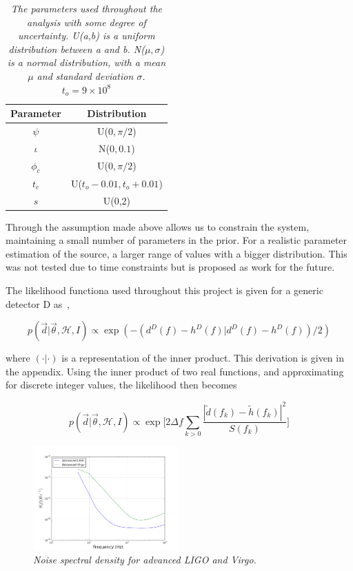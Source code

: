 \documentclass[12pt]{iopart}
\newcommand{\curlH}{\mathcal{H}}
\begin{document}
\begin{table}
  \centering
  \begin{tabular}{|c|c|}
    \hline
    Parameter & Distribution \\
    \hline
    $\psi$   &  U($0,\pi/2$)\\
    $\iota$   & N($0,0.1$) \\
    $\phi_c$  & U($0,\pi/2$)\\
    $t_c$     & U($t_{o}-0.01, t_{o}+0.01$) \\
    $s$       & U(0,2) \\
    \hline
  \end{tabular}
  \label{tab:prior}
  \caption{\textit{The parameters used throughout the analysis with some degree
of uncertainty. U(a,b) is a uniform distribution between a and b. N($\mu,
\sigma$) is a normal distribution, with a mean $\mu$ and standard deviation
$\sigma$. $t_{o} = 9\times10^{8}$}}
\end{table}

Through the assumption made above allows us to constrain the system,
maintaining a small number of parameters in the prior. For a realistic
parameter estimation of the source, a larger range of values with a bigger
distribution. This was not tested due to time constraints but is proposed as
work for the future.

The likelihood functiona used throughout this project is given for a generic
detector D as~\cite{JVei},

\begin{equation}
  p(\vec{d} | \vec{\theta}, \curlH, I) \propto \exp(-(d^{D}(f) -
h^{D}(f)|d^{D}(f) - h^{D}(f))/2)
\end{equation}

where $(\cdot |\cdot )$ is a representation of the inner product. This
derivation is given in the appendix. Using the inner product of two real
functions, and approximating for discrete integer values, the likelihood then
becomes

\begin{equation}
  p(\vec{d} | \vec{\theta}, \curlH, I) \propto \exp\Bigg[ 2\Delta
f\sum_{k>0}\frac{|\tilde{d}(f_{k}) - \tilde{h}(f_{k})|^{2}}{S(f_{k})} \Bigg]
\end{equation}

\begin{figure}
  \centering
  \includegraphics[width=0.5\textwidth]{PSD}
  \caption{\textit{Noise spectral density for advanced LIGO and Virgo.}}
  \label{fig:psd}
\end{figure}
\end{document}
